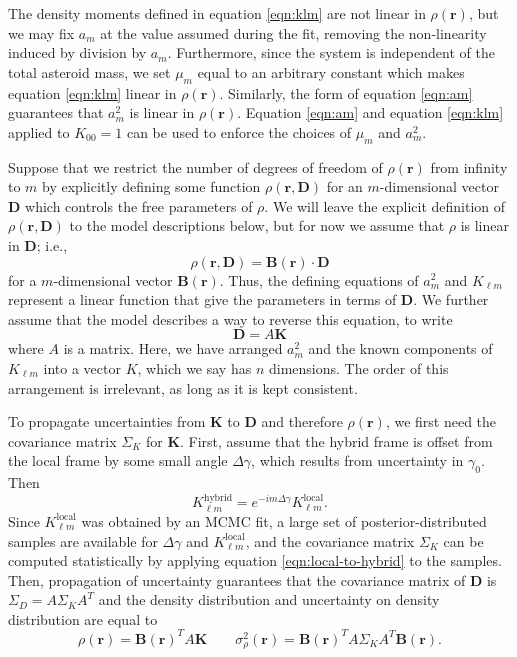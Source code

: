 \documentclass[fleqn,usenatbib]{mnras}
\begin{document}
The density moments defined in equation \ref{eqn:klm} are not linear in $\rho(\bm r)$, but we may fix $a_m$ at the value assumed during the fit, removing the non-linearity induced by division by $a_m$. Furthermore, since the system is independent of the total asteroid mass, we set $\mu_m$ equal to an arbitrary constant which makes equation \ref{eqn:klm} linear in $\rho(\bm r)$. Similarly, the form of equation \ref{eqn:am} guarantees that $a_m^2$ is linear in $\rho(\bm r)$. Equation \ref{eqn:am} and equation \ref{eqn:klm} applied to $K_{00}=1$ can be used to enforce the choices of $\mu_m$ and $a_m^2$.

Suppose that we restrict the number of degrees of freedom of $\rho(\bm r)$ from infinity to $m$ by explicitly defining some function $\rho(\bm r, \bm D)$ for an $m$-dimensional vector $\bm D$ which controls the free parameters of $\rho$. We will leave the explicit definition of $\rho(\bm r, \bm D)$ to the model descriptions below, but for now we assume that $\rho$ is linear in $\bm D$; i.e.,
\begin{equation}
  \rho(\bm r, \bm D) = \bm B(\bm r) \cdot \bm D
  \label{eqn:density-distro}
\end{equation}
for a $m$-dimensional vector $\bm B(\bm r)$. Thus, the defining equations of $a_m^2$ and $K_{\ell m}$ represent a linear function that give the parameters in terms of $\bm D$. We further assume that the model describes a way to reverse this equation, to write
\begin{equation}
  \bm D = A \bm K
  \label{eqn:density-model}
\end{equation}
where $A$ is a matrix. Here, we have arranged $a_m^2$ and the known components of $K_{\ell m}$ into a vector $K$, which we say has $n$ dimensions. The order of this arrangement is irrelevant, as long as it is kept consistent.

To propagate uncertainties from $\bm K$ to $\bm D$ and therefore $\rho(\bm r)$, we first need the covariance matrix $\Sigma_K$ for $\bm K$. First, assume that the hybrid frame is offset from the local frame by some small angle $\Delta \gamma$, which results from uncertainty in $\gamma_0$. Then
\begin{equation}
  K_{\ell m}^\mathrm{hybrid} = e^{-im\Delta \gamma}K_{\ell m}^\mathrm{local}.
  \label{eqn:local-to-hybrid}
\end{equation}
Since $K_{\ell m}^\mathrm{local}$ was obtained by an MCMC fit, a large set of posterior-distributed samples are available for $\Delta \gamma$ and $K_{\ell m}^\mathrm{local}$, and the covariance matrix $\Sigma_K$ can be computed statistically by applying equation \ref{eqn:local-to-hybrid} to the samples. Then, propagation of uncertainty guarantees that the covariance matrix of $\bm D$ is $\Sigma_D = A \Sigma_K A^T$
and the density distribution and uncertainty on density distribution are equal to
\begin{equation}
  \rho(\bm r) = \bm B(\bm r)^T A\bm K \qquad \sigma^2_\rho(\bm r) = \bm B(\bm r)^T A \Sigma_K A^T \bm B(\bm r).
  \label{eqn:unc-rho}
\end{equation}
\end{document}

